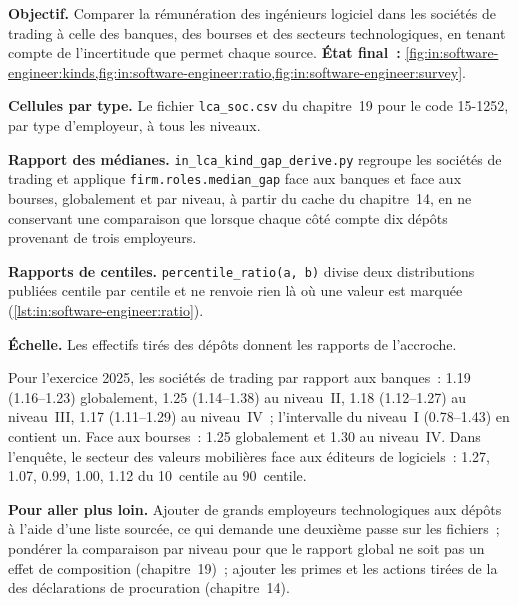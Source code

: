 \begin{tutorial}
\textbf{Objectif.} Comparer la rémunération des ingénieurs logiciel dans les sociétés de trading à celle des banques, des bourses et des secteurs technologiques, en tenant compte de
l'incertitude que permet chaque source.
\textbf{État final~:} \cref{fig:in:software-engineer:kinds,fig:in:software-engineer:ratio,fig:in:software-engineer:survey}.
\begin{tutsteps}
\item \textbf{Cellules par type.} Le fichier \texttt{lca\_soc.csv} du chapitre~19 pour le code 15-1252, par type d'employeur, à tous les niveaux.
\item \textbf{Rapport des médianes.} \texttt{in\_lca\_kind\_gap\_derive.py} regroupe les sociétés de trading et applique
\texttt{firm.roles.median\_gap} face aux banques et face aux bourses, globalement et par niveau, à partir du cache du chapitre~14,
en ne conservant une comparaison que lorsque chaque côté compte dix dépôts provenant de trois employeurs.
\item \textbf{Rapports de centiles.} \texttt{percentile\_ratio(a, b)} divise deux distributions publiées centile par
centile et ne renvoie rien là où une valeur est marquée (\cref{lst:in:software-engineer:ratio}).
\label{lst:in:software-engineer:ratio}
\item \textbf{Échelle.} Les effectifs tirés des dépôts donnent les rapports de l'accroche.
\end{tutsteps}
\end{tutorial}

Pour l'exercice 2025, les sociétés de trading par rapport aux banques~: 1.19 (1.16--1.23) globalement, 1.25 (1.14--1.38) au niveau~II, 1.18 (1.12--1.27) au
niveau~III, 1.17 (1.11--1.29) au niveau~IV~; l'intervalle du niveau~I (0.78--1.43) en contient un. Face aux bourses~: 1.25 globalement et
1.30 au niveau~IV. Dans l'enquête, le secteur des valeurs mobilières face aux éditeurs de logiciels~: 1.27, 1.07, 0.99, 1.00, 1.12 du 10~centile au
90~centile.

\textbf{Pour aller plus loin.} Ajouter de grands employeurs technologiques aux dépôts à l'aide d'une liste sourcée, ce qui demande une deuxième
passe sur les fichiers~; pondérer la comparaison par niveau pour que le rapport global ne soit pas un effet de composition (chapitre~19)~; ajouter les primes
et les actions tirées de la  des déclarations de procuration (chapitre~14).

